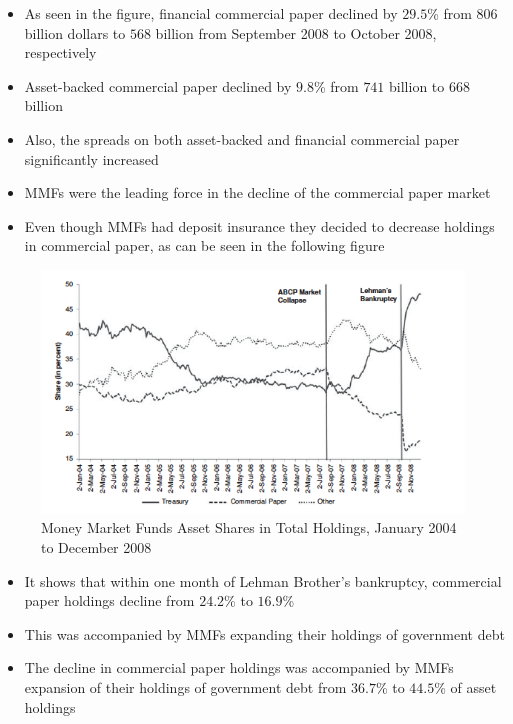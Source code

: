 \documentclass[11pt]{beamer}
\begin{document}
\begin{frame}
\begin{itemize}
\item As seen in the figure, financial commercial paper declined by $29.5$\% from $806$ billion dollars to $568$ billion from September 2008 to October 2008, respectively
\item Asset-backed commercial paper declined by $9.8$\% from $741$ billion to $668$ billion
\item Also, the spreads on both asset-backed and financial commercial paper significantly increased
\item MMFs were the leading force in the decline of the commercial paper market
\item Even though MMFs had deposit insurance they decided to decrease holdings in commercial paper, as can be seen in the following figure
\end{itemize}
\end{frame}

\begin{frame}
\begin{figure}
\includegraphics[width=\textwidth]{10_4.png}
\caption{Money Market Funds Asset Shares in Total Holdings, January 2004 to December 2008}
\end{figure}
\end{frame}

\begin{frame}
\begin{itemize}
\item It shows that within one month of Lehman Brother's bankruptcy, commercial paper holdings decline from $24.2$\% to $16.9$\%
\item This was accompanied by MMFs expanding their holdings of government debt
\item The decline in commercial paper holdings was accompanied by MMFs expansion of their holdings of government debt from $36.7$\% to $44.5$\% of asset holdings
\end{itemize}
\end{frame}
\end{document}
